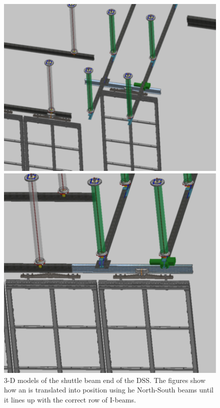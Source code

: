 \begin{figure}[htbp]
\begin{center}
\begin{minipage}[c]{0.49\textwidth}
\includegraphics[width=\textwidth]{far-detector-single-phase/figures/Shuttle-1.pdf}
\end{minipage}
\begin{minipage}[c]{0.42\textwidth}
\includegraphics[width=\textwidth]{far-detector-single-phase/figures/shuttle-2.pdf}
\end{minipage}
\caption{3-D models of the shuttle beam end of the DSS. The figures show how an 
is translated into position using he North-South beams until it lines up with the correct
row of I-beams.}
\label{shuttle}
\end{center}
\end{figure}

